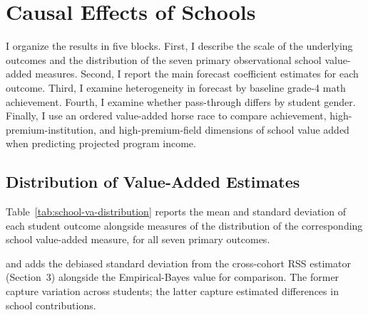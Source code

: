 \documentclass[a4paper, article, english, oneside, unknownkeysallowed, 12pt]{memoir}
\begin{document}


%


%



\section{Causal Effects of Schools}

I organize the results in five blocks.
First, I describe the scale of the underlying outcomes and the distribution of the seven primary observational school value-added measures.
Second, I report the main forecast coefficient estimates for each outcome.
Third, I examine heterogeneity in forecast by baseline grade-4 math achievement.
Fourth, I examine whether pass-through differs by student gender.
Finally, I use an ordered value-added horse race to compare achievement, high-premium-institution, and high-premium-field dimensions of school value added when predicting projected program income.

\subsection{Distribution of Value-Added Estimates}

Table~\ref{tab:school-va-distribution} reports the mean and standard deviation of each student outcome alongside measures of the  distribution of the corresponding school value-added measure, for all seven primary outcomes.



 and adds the debiased standard deviation from the cross-cohort RSS estimator (Section~3) alongside the Empirical-Bayes value for comparison.
The former capture variation across students; the latter capture estimated differences in school contributions.



\end{document}

